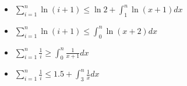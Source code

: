 \documentclass[12pt,twoside]{article}
\begin{document}
\begin{problem}{20}
\begin{itemize}

\item $\displaystyle \sum_{i=1}^n \ln (i+1) \le \ln 2 + \int_1^n
\ln(x+1) dx $

\item $\displaystyle \sum_{i=1}^n \ln (i+1) \le \int_0^n \ln(x+2)
dx $

\item $\displaystyle \sum_{i=1}^n \frac{1}{i} \ge \int_0^n
\frac{1}{x+1} dx $

\item $\displaystyle \sum_{i=1}^n \frac{1}{i} \le 1.5 + \int_3^n
\frac{1}{x} dx $


\end{itemize}



\end{problem}
\end{document}
